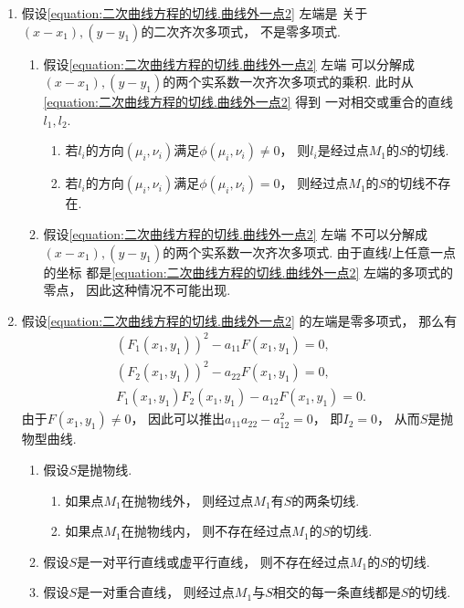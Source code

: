 \begin{enumerate}
	\item 假设\cref{equation:二次曲线方程的切线.曲线外一点2} 左端是
	关于\((x-x_1),(y-y_1)\)的二次齐次多项式，
	不是零多项式.
	\begin{enumerate}
		\item 假设\cref{equation:二次曲线方程的切线.曲线外一点2} 左端
		可以分解成\((x-x_1),(y-y_1)\)的两个实系数一次齐次多项式的乘积.
		此时从\cref{equation:二次曲线方程的切线.曲线外一点2} 得到
		一对相交或重合的直线\(l_1,l_2\).
		\begin{enumerate}
			\item 若\(l_i\)的方向\((\mu_i,\nu_i)\)满足\(\phi(\mu_i,\nu_i) \neq 0\)，
			则\(l_i\)是经过点\(M_1\)的\(S\)的切线.
			\item 若\(l_i\)的方向\((\mu_i,\nu_i)\)满足\(\phi(\mu_i,\nu_i) = 0\)，
			则经过点\(M_1\)的\(S\)的切线不存在.
		\end{enumerate}
		\item 假设\cref{equation:二次曲线方程的切线.曲线外一点2} 左端
		不可以分解成\((x-x_1),(y-y_1)\)的两个实系数一次齐次多项式.
		由于直线\(l\)上任意一点的坐标
		都是\cref{equation:二次曲线方程的切线.曲线外一点2} 左端的多项式的零点，
		因此这种情况不可能出现.
	\end{enumerate}
	\item 假设\cref{equation:二次曲线方程的切线.曲线外一点2} 的左端是零多项式，
	那么有\begin{gather*}
		(F_1(x_1,y_1))^2 - a_{11} F(x_1,y_1) = 0, \\
		(F_2(x_1,y_1))^2 - a_{22} F(x_1,y_1) = 0, \\
		F_1(x_1,y_1) F_2(x_1,y_1) - a_{12} F(x_1,y_1) = 0.
	\end{gather*}
	由于\(F(x_1,y_1) \neq 0\)，
	因此可以推出\(a_{11} a_{22} - a_{12}^2 = 0\)，
	即\(I_2 = 0\)，
	从而\(S\)是抛物型曲线.
	\begin{enumerate}
		\item 假设\(S\)是抛物线.
		\begin{enumerate}
			\item 如果点\(M_1\)在抛物线外，
			则经过点\(M_1\)有\(S\)的两条切线.
			\item 如果点\(M_1\)在抛物线内，
			则不存在经过点\(M_1\)的\(S\)的切线.
		\end{enumerate}
		\item 假设\(S\)是一对平行直线或虚平行直线，
		则不存在经过点\(M_1\)的\(S\)的切线.
		\item 假设\(S\)是一对重合直线，
		则经过点\(M_1\)与\(S\)相交的每一条直线都是\(S\)的切线.
	\end{enumerate}
\end{enumerate}

